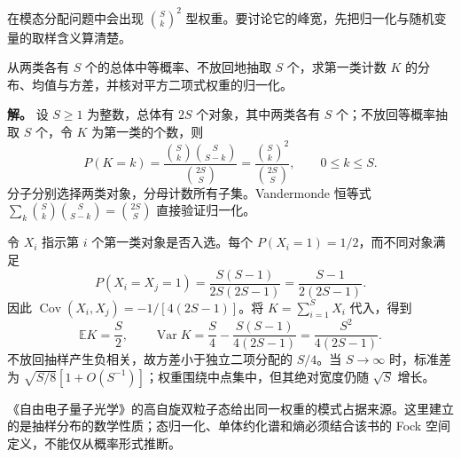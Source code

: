 在模态分配问题中会出现 $\binom Sk^2$ 型权重。要讨论它的峰宽，先把归一化与随机变量的取样含义算清楚。

\begin{example}[平方二项式权重的超几何分布]
从两类各有 $S$ 个的总体中等概率、不放回地抽取 $S$ 个，求第一类计数 $K$ 的分布、均值与方差，并核对平方二项式权重的归一化。

\textbf{解。} 设 $S\ge1$ 为整数，总体有 $2S$ 个对象，其中两类各有 $S$ 个；不放回等概率抽取 $S$ 个，令 $K$ 为第一类的个数，则
\begin{equation}\label{eq:math-ghs-hypergeometric-probability}
 P(K=k)=\frac{\binom Sk\binom S{S-k}}{\binom{2S}S}
 =\frac{\binom Sk^2}{\binom{2S}S},\qquad 0\le k\le S.
\end{equation}
分子分别选择两类对象，分母计数所有子集。Vandermonde 恒等式 $\sum_k\binom Sk\binom S{S-k}=\binom{2S}S$ 直接验证归一化。

令 $X_i$ 指示第 $i$ 个第一类对象是否入选。每个 $P(X_i=1)=1/2$，而不同对象满足
\[
 P(X_i=X_j=1)=\frac{S(S-1)}{2S(2S-1)}
 =\frac{S-1}{2(2S-1)}.
\]
因此 $\operatorname{Cov}(X_i,X_j)=-1/[4(2S-1)]$。将 $K=\sum_{i=1}^SX_i$ 代入，得到
\begin{equation}\label{eq:math-ghs-hypergeometric-moments}
 \mathbb E K=\frac S2,\qquad
 \operatorname{Var}K=\frac S4-\frac{S(S-1)}{4(2S-1)}
 =\frac{S^2}{4(2S-1)}.
\end{equation}
不放回抽样产生负相关，故方差小于独立二项分配的 $S/4$。当 $S\to\infty$ 时，标准差为 $\sqrt{S/8}[1+O(S^{-1})]$；权重围绕中点集中，但其绝对宽度仍随 $\sqrt S$ 增长。
\end{example}

《自由电子量子光学》的高自旋双粒子态给出同一权重的模式占据来源。这里建立的是抽样分布的数学性质；态归一化、单体约化谱和熵必须结合该书的 Fock 空间定义，不能仅从概率形式推断。
